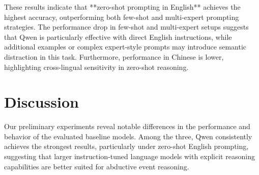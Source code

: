 \documentclass[11pt]{article}
\begin{document}
These results indicate that **zero-shot prompting in English** achieves the highest accuracy, outperforming both few-shot and multi-expert prompting strategies. The performance drop in few-shot and multi-expert setups suggests that Qwen is particularly effective with direct English instructions, while additional examples or complex expert-style prompts may introduce semantic distraction in this task. Furthermore, performance in Chinese is lower, highlighting cross-lingual sensitivity in zero-shot reasoning.









\section{Discussion}

Our preliminary experiments reveal notable differences in the performance and behavior of the evaluated baseline models. Among the three, Qwen consistently achieves the strongest results, particularly under zero-shot English prompting, suggesting that larger instruction-tuned language models with explicit reasoning capabilities are better suited for abductive event reasoning.
\end{document}
